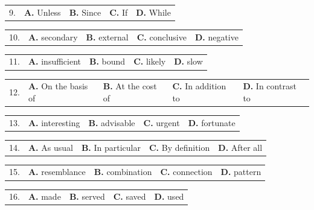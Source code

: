 \documentclass[UTF8,11pt]{ctexart}
\begin{document}
\noindent\begin{tabularx}{\linewidth}{@{}lXXXX@{}}9. & \textbf{A.} Unless & \textbf{B.} Since & \textbf{C.} If & \textbf{D.} While\\\end{tabularx}\par

\noindent\begin{tabularx}{\linewidth}{@{}lXXXX@{}}10. & \textbf{A.} secondary & \textbf{B.} external & \textbf{C.} conclusive & \textbf{D.} negative\\\end{tabularx}\par

\noindent\begin{tabularx}{\linewidth}{@{}lXXXX@{}}11. & \textbf{A.} insufficient & \textbf{B.} bound & \textbf{C.} likely & \textbf{D.} slow\\\end{tabularx}\par

\noindent\begin{tabularx}{\linewidth}{@{}lXXXX@{}}12. & \textbf{A.} On the basis of & \textbf{B.} At the cost of & \textbf{C.} In addition to & \textbf{D.} In contrast to\\\end{tabularx}\par

\noindent\begin{tabularx}{\linewidth}{@{}lXXXX@{}}13. & \textbf{A.} interesting & \textbf{B.} advisable & \textbf{C.} urgent & \textbf{D.} fortunate\\\end{tabularx}\par

\noindent\begin{tabularx}{\linewidth}{@{}lXXXX@{}}14. & \textbf{A.} As usual & \textbf{B.} In particular & \textbf{C.} By definition & \textbf{D.} After all\\\end{tabularx}\par

\noindent\begin{tabularx}{\linewidth}{@{}lXXXX@{}}15. & \textbf{A.} resemblance & \textbf{B.} combination & \textbf{C.} connection & \textbf{D.} pattern\\\end{tabularx}\par

\noindent\begin{tabularx}{\linewidth}{@{}lXXXX@{}}16. & \textbf{A.} made & \textbf{B.} served & \textbf{C.} saved & \textbf{D.} used\\\end{tabularx}\par
\end{document}
